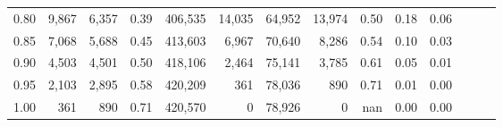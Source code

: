 \begin{tabular}{rrrrrrrrrrrrrr}
0.80 &   9,867 &  6,357 &  0.39 &  406,535 &   14,035 &  64,952 &  13,974 &  0.50 &  0.18 &      0.06 \\
0.85 &   7,068 &  5,688 &  0.45 &  413,603 &    6,967 &  70,640 &   8,286 &  0.54 &  0.10 &      0.03 \\
0.90 &   4,503 &  4,501 &  0.50 &  418,106 &    2,464 &  75,141 &   3,785 &  0.61 &  0.05 &      0.01 \\
0.95 &   2,103 &  2,895 &  0.58 &  420,209 &      361 &  78,036 &     890 &  0.71 &  0.01 &      0.00 \\
1.00 &     361 &    890 &  0.71 &  420,570 &        0 &  78,926 &       0 &   nan &  0.00 &      0.00 \\
\bottomrule
\end{tabular}
